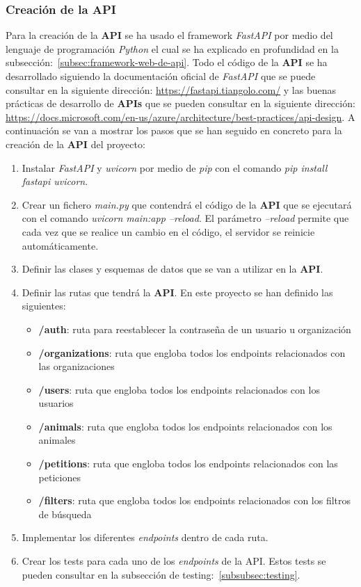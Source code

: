 \subsubsection{Creación de la API}\label{subsubsec:creacion-de-la-api}

Para la creación de la \textbf{API} se ha usado el framework \textit{FastAPI} por medio del lenguaje de programación \textit{Python} el cual
se ha explicado en profundidad en la subsección:~\ref{subsec:framework-web-de-api}. Todo el código de la \textbf{API} se ha desarrollado
siguiendo la documentación oficial de \textit{FastAPI} que se puede consultar en la siguiente dirección: \url{https://fastapi.tiangolo.com/} y
las buenas prácticas de desarrollo de \textbf{APIs} que se pueden consultar en la siguiente dirección: \url{https://docs.microsoft.com/en-us/azure/architecture/best-practices/api-design}.
A continuación se van a mostrar los pasos que se han seguido en concreto para la creación de la \textbf{API} del proyecto:

\begin{enumerate}
    \item Instalar \textit{FastAPI} y \textit{uvicorn} por medio de \textit{pip} con el comando
    \textit{pip install fastapi uvicorn}.
    \item Crear un fichero \textit{main.py} que contendrá el código de la \textbf{API} que se ejecutará con el comando
    \textit{uvicorn main:app --reload}. El parámetro \textit{--reload} permite que cada vez que se realice un cambio
    en el código, el servidor se reinicie automáticamente.
    \item Definir las clases y esquemas de datos que se van a utilizar en la \textbf{API}.
    \item Definir las rutas que tendrá la \textbf{API}. En este proyecto se han definido las siguientes:
        \begin{itemize}
            \item \textbf{/auth}: ruta para reestablecer la contraseña de un usuario u organización
            \item \textbf{/organizations}: ruta que engloba todos los endpoints relacionados con las organizaciones
            \item \textbf{/users}: ruta que engloba todos los endpoints relacionados con los usuarios
            \item \textbf{/animals}: ruta que engloba todos los endpoints relacionados con los animales
            \item \textbf{/petitions}: ruta que engloba todos los endpoints relacionados con las peticiones
            \item \textbf{/filters}: ruta que engloba todos los endpoints relacionados con los filtros de búsqueda
        \end{itemize}
    \item Implementar los diferentes \textit{endpoints} dentro de cada ruta.
    \item Crear los tests para cada uno de los \textit{endpoints} de la API. Estos tests se pueden consultar en la
    subsección de testing:~\ref{subsubsec:testing}.
\end{enumerate}

